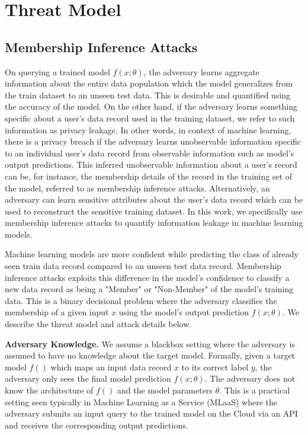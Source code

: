 \section{Threat Model}\label{threatmodel}

\subsection{Membership Inference Attacks}


On querying a trained model $f(x;\theta)$, the adversary learns aggregate information about the entire data population which the model generalizes from the train dataset to an unseen test data.
This is desirable and quantified using the accuracy of the model.
On the other hand, if the adversary learns something specific about a user's data record used in the training dataset, we refer to such information as privacy leakage.
In other words, in context of machine learning, there is a privacy breach if the adversary learns unobservable information specific to an individual user's data record from observable information such as model's output predictions.
This inferred unobservable information about a user's record can be, for instance, the membership details of the record in the training set of the model, referred to as membership inference attacks.
Alternatively, an adversary can learn sensitive attributes about the user's data record which can be used to reconstruct the sensitive training dataset.
In this work, we specifically use membership inference attacks to quantify information leakage in machine learning models.

Machine learning models are more confident while predicting the class of already seen train data record compared to an unseen test data record.
Membership inference attacks exploits this difference in the model's confidence to classify a new data record as being a "Member" or "Non-Member" of the model's training data.
This is a binary decisional problem where the adversary classifies the membership of a given input $x$ using the model's output prediction $f(x;\theta)$.
We describe the threat model and attack details below.

\noindent\textbf{Adversary Knowledge.} We assume a blackbox setting where the adversary is assumed to have no knowledge about the target model.
Formally, given a target model $f()$ which maps an input data record $x$ to its correct label $y$, the adversary only sees the final model prediction $f(x;\theta)$.
The adversary does not know the architecture of $f()$ and the model parameters $\theta$.
This is a practical setting seen typically in Machine Learning as a Service (MLaaS) where the adversary submits an input query to the trained model on the Cloud via an API and receives the corresponding output predictions.

